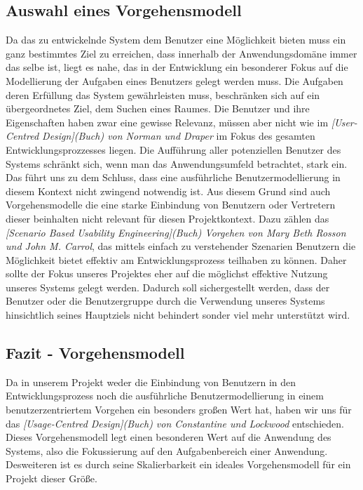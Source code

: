 \subsection{Auswahl eines Vorgehensmodell}
\label{sec:Auswahl_eines_Vorgehensmodell}
Da das zu entwickelnde System dem Benutzer eine Möglichkeit bieten muss ein
ganz bestimmtes Ziel zu erreichen, dass innerhalb der Anwendungsdomäne immer
das selbe ist, liegt es nahe, das in der Entwicklung ein besonderer Fokus auf
die Modellierung der Aufgaben eines Benutzers gelegt werden muss. Die Aufgaben
deren Erfüllung das System gewährleisten muss, beschränken sich auf ein
übergeordnetes Ziel, dem Suchen eines Raumes. Die Benutzer und ihre
Eigenschaften haben zwar eine gewisse Relevanz, müssen aber nicht wie \zB im
\textit{[User-Centred Design](Buch) von Norman und Draper} im Fokus des gesamten
Entwicklungsprozzesses liegen. Die Aufführung aller potenziellen Benutzer des
Systems schränkt sich, wenn man das Anwendungsumfeld betrachtet, stark ein.
Das führt uns zu dem Schluss, dass eine ausführliche Benutzermodellierung in
diesem Kontext nicht zwingend notwendig ist. Aus diesem Grund sind auch
Vorgehensmodelle die eine starke Einbindung von Benutzern oder Vertretern
dieser beinhalten nicht relevant für diesen Projektkontext.
Dazu zählen \zB das \textit{[Scenario Based Usability Engineering](Buch) Vorgehen von Mary Beth Rosson und John M. Carrol},
das mittels einfach zu verstehender Szenarien Benutzern die Möglichkeit bietet
effektiv am Entwicklungsprozess teilhaben zu können. Daher sollte der Fokus
unseres Projektes eher auf die möglichst effektive Nutzung unseres Systems
gelegt werden. Dadurch soll sichergestellt werden, dass der Benutzer oder die
Benutzergruppe durch die Verwendung unseres Systems hinsichtlich seines
Hauptziels nicht behindert sonder viel mehr unterstützt wird.

\subsection{Fazit - Vorgehensmodell}
\label{sec:Fazit_Vorgehensmodell}

Da in unserem Projekt weder die Einbindung von Benutzern in den
Entwicklungsprozess noch die ausführliche Benutzermodellierung in einem
benutzerzentriertem Vorgehen ein besonders großen Wert hat, haben wir uns für
das \textit{[Usage-Centred Design](Buch) von Constantine und Lockwood}
entschieden. Dieses Vorgehensmodell legt einen besonderen Wert auf die
Anwendung des Systems, also die Fokussierung auf den Aufgabenbereich einer
Anwendung. Desweiteren ist es durch seine Skalierbarkeit ein ideales
Vorgehensmodell für ein Projekt dieser Größe.

